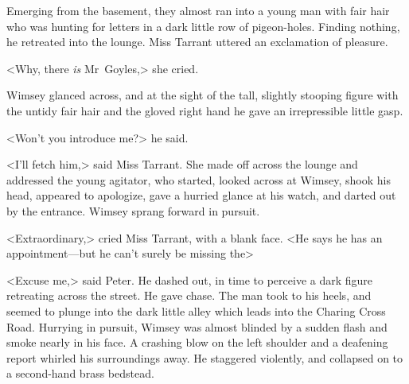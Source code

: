 Emerging from the basement, they almost ran into a young man with fair hair who was hunting for letters in a dark little row of pigeon-holes.  Finding nothing, he retreated into the lounge. Miss Tarrant uttered an exclamation of pleasure.

<Why, there \emph{is} Mr~Goyles,> she cried.

Wimsey glanced across, and at the sight of the tall, slightly stooping figure with the untidy fair hair and the gloved right hand he gave an irrepressible little gasp.

<Won't you introduce me?> he said.

<I'll fetch him,> said Miss Tarrant. She made off across the lounge and addressed the young agitator, who started, looked across at Wimsey, shook his head, appeared to apologize, gave a hurried glance at his watch, and darted out by the entrance. Wimsey sprang forward in pursuit.

<Extraordinary,> cried Miss Tarrant, with a blank face. <He says he has an appointment—but he can't surely be missing the\longdash>

<Excuse me,> said Peter. He dashed out, in time to perceive a dark figure retreating across the street. He gave chase. The man took to his heels, and seemed to plunge into the dark little alley which leads into the Charing Cross Road. Hurrying in pursuit, Wimsey was almost blinded by a sudden flash and smoke nearly in his face. A crashing blow on the left shoulder and a deafening report whirled his surroundings away. He staggered violently, and collapsed on to a second-hand brass bedstead.
